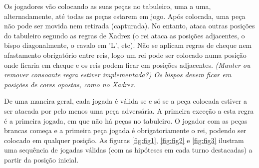 \documentclass[a4paper]{article}
\begin{document}
Os jogadores vão colocando as suas peças no tabuleiro, uma a uma, alternadamente, até todas as peças estarem em jogo.
Após colocada, uma peça não pode ser movida nem retirada (capturada).
No entanto, ataca outras posições do tabuleiro segundo as regras de Xadrez (o rei ataca as posições adjacentes, o bispo diagonalmente, o cavalo em 'L', etc).
Não se aplicam regras de cheque nem afastamento obrigatório entre reis, logo um rei pode ser colocado numa posição onde ficaria em cheque e os reis podem ficar em posições adjacentes. \textit{(Manter ou remover consoante regra estiver implementada?) Os bispos devem ficar em posições de cores opostas, como no Xadrez.}\newline

De uma maneira geral, cada jogada é válida se e só se a peça colocada estiver a ser atacada por pelo menos uma peça adversária. A primeira exceção a esta regra é a primeira jogada, em que não há peças no tabuleiro. O jogador com as peças brancas começa e a primeira peça jogada é obrigatoriamente o rei, podendo ser colocado em qualquer posição.
As figuras \ref{fig:fig1}, \ref{fig:fig2} e \ref{fig:fig3} ilustram uma sequência de jogadas válidas (com as hipóteses em cada turno destacadas) a partir da posição inicial.
\end{document}
